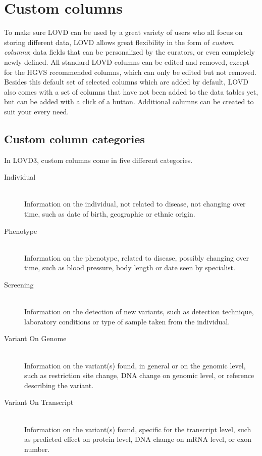 \documentclass[a4paper,oneside,openany,12pt]{memoir}
\begin{document}
\chapter{Custom columns}
To make sure LOVD can be used by a great variety of users who all focus on storing different data,
 LOVD allows great flexibility in the form of \emph{custom columns}; data fields that can be personalized by the curators,
 or even completely newly defined.
All standard LOVD columns can be edited and removed, except for the HGVS recommended columns,
 which can only be edited but not removed.
Besides this default set of selected columns which are added by default,
 LOVD also comes with a set of columns that have not been added to the data tables yet,
 but can be added with a click of a button.
Additional columns can be created to suit your every need.





\hypertarget{sec:custom_column_categories}{}
\section{Custom column categories}
In LOVD3, custom columns come in five different categories.
\begin{description}
  \item[Individual] \hfill \\
  Information on the individual, not related to disease, not changing over time, such as date of birth, geographic or ethnic origin.
  \item[Phenotype] \hfill \\
  Information on the phenotype, related to disease, possibly changing over time, such as blood pressure, body length or date seen by specialist.
  \item[Screening] \hfill \\
  Information on the detection of new variants, such as detection technique, laboratory conditions or type of sample taken from the individual.
  \item[Variant On Genome] \hfill \\
  Information on the variant(s) found, in general or on the genomic level, such as restriction site change, DNA change on genomic level, or reference describing the variant.
  \item[Variant On Transcript] \hfill \\
  Information on the variant(s) found, specific for the transcript level, such as predicted effect on protein level, DNA change on mRNA level, or exon number.
\end{description}
\end{document}
